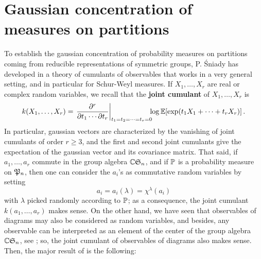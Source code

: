 \documentclass[10pt]{amsart}
\begin{document}
\section{Gaussian concentration of measures on partitions}\label{sniady}
To establish the gaussian concentration of probability measures on partitions coming from reducible representations of symmetric groups, P. \'Sniady has developed in \cite{Sni06} a theory of cumulants of observables that works in a very general setting, and in particular for Schur-Weyl measures. If $X_{1},\ldots,X_{r}$ are real or complex random variables, we recall that the \textbf{joint cumulant} of $X_{1},\ldots,X_{r}$ is
$$k(X_{1},\ldots,X_{r})=\left.\frac{\partial^{r}}{\partial t_{1}\cdots \partial t_{r}}\right|_{t_{1}=t_{2}=\cdots=t_{r}=0}\!\!\!\log \mathbb{E}[\exp(t_{1}X_{1}+\cdots+ t_{r}X_{r})]\,.$$
In particular, gaussian vectors are characterized by the vanishing of joint cumulants of order $r\geq 3$, and the first and second joint cumulants give the expectation of the gaussian vector and its covariance matrix. That said, if $a_{1},\ldots,a_{r}$ commute in the group algebra $\mathbb{C}\mathfrak{S}_{n}$, and if $\mathbb{P}$ is a probability measure on $\mathfrak{P}_{n}$, then one can consider the $a_{i}$'s as commutative random variables by setting
$$a_{i}=a_{i}(\lambda)=\chi^{\lambda}(a_{i})$$
with $\lambda$ picked randomly according to $\mathbb{P}$; as a consequence, the joint cumulant $k(a_{1},\ldots,a_{r})$ makes sense.  On the other hand, we have seen that observables of diagrams may also be considered as random variables, and besides, any observable can be interpreted as an element of the center of the group algebra $\mathbb{C}\mathfrak{S}_{n}$, see \cite[\S2.1]{Sni06}; so, the joint cumulant of observables of diagrams also makes sense. Then, the major result of \cite{Sni06} is the following:
\end{document}
